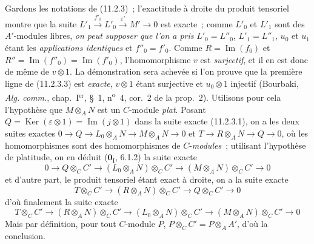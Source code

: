 Gardons les notations de (11.2.3)~; l'exactitude à droite du produit
tensoriel montre que la suite
$L'_1\xrightarrow{f'_0}L'_0\xrightarrow{\varepsilon'}M'\to0$ est exacte~;
comme $L'_0$ et $L'_1$ sont des $A'$-modules libres, \emph{on peut supposer
que l'on a pris} $L'_0=L''_0$, $L'_1=L''_1$, $u_0$ et $u_1$ étant les
\emph{applications identiques} et $f''_0=f'_0$. Comme
$R=\operatorname{Im}(f_0)$ et $R''=\operatorname{Im}(f''_0)=
\operatorname{Im}(f'_0)$, l'homomorphisme $v$ est \emph{surjectif}, et il en est
donc de même de $v\otimes1$. La démonstration sera achevée si l'on prouve que
la première ligne de (11.2.3.3) est \emph{exacte}, $v\otimes1$ étant
surjective et $u_0\otimes1$ injectif (Bourbaki, \emph{Alg. comm.},
chap.~I$^{\mathrm{er}}$, \S~1, n\textsuperscript{o}~4, cor.~2 de la prop.~2).
Utilisons pour cela
l'hypothèse que $M\otimes_AN$ est un $C$-module \emph{plat}. Posant
$Q=\operatorname{Ker}(\varepsilon\otimes1)=\operatorname{Im}(j\otimes1)$
dans la suite exacte (11.2.3.1), on a les deux suites exactes
$0\to Q\to L_0\otimes_AN\to M\otimes_AN\to0$ et
$T\to R\otimes_AN\to Q\to0$, où les homomorphismes sont des homomorphismes
de $C$-\emph{modules}~; utilisant l'hypothèse de platitude, on en déduit
($\mathbf 0_{\mathrm I}$, 6.1.2) la suite exacte
\[
0\to Q\otimes_CC'\to(L_0\otimes_AN)\otimes_CC'
\to(M\otimes_AN)\otimes_CC'\to0
\]
et d'autre part, le produit tensoriel étant exact à droite, on a la suite
exacte
\[
T\otimes_CC'\to(R\otimes_AN)\otimes_CC'\to Q\otimes_CC'\to0
\]
d'où finalement la suite exacte
\[
T\otimes_CC'\to(R\otimes_AN)\otimes_CC'\to
(L_0\otimes_AN)\otimes_CC'\to(M\otimes_AN)\otimes_CC'\to0
\]
Mais par définition, pour tout $C$-module $P$,
$P\otimes_CC'=P\otimes_AA'$, d'où la conclusion.

